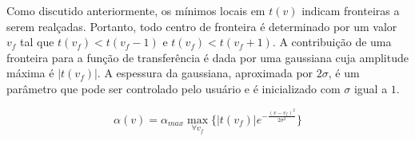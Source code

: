 	Como discutido anteriormente, os mínimos locais em $ t(v) $ indicam fronteiras a serem realçadas. Portanto, todo centro de fronteira é determinado por um valor $ v_{f} $ tal que $t(v_{f}) < t(v_{f} - 1)$ e $ t(v_{f}) < t(v_{f} + 1)$. A contribuição de uma fronteira para a função de transferência é dada por uma gaussiana cuja amplitude máxima é $ |t(v_{f})| $. A espessura da gaussiana, aproximada por $ 2\sigma $, é um parâmetro que pode ser controlado pelo usuário e é inicializado com $ \sigma $ igual a $ 1 $.

\begin{equation}
	\alpha(v) = \alpha_{max}\max_{\forall v_{f}}\big\{|t(v_{f})|e^{-\frac{(v-v_{f})^{2}}{2\sigma^{2}}}\big\}
\end{equation}